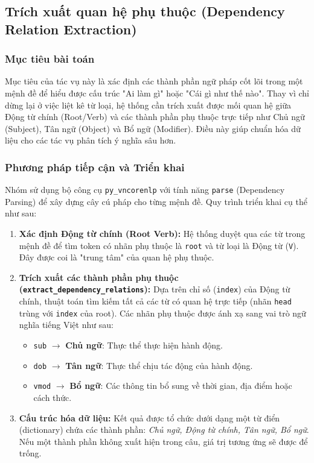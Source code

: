 \subsection{Trích xuất quan hệ phụ thuộc (Dependency Relation Extraction)}

\subsubsection{Mục tiêu bài toán}
Mục tiêu của tác vụ này là xác định các thành phần ngữ pháp cốt lõi trong một mệnh đề để hiểu được cấu trúc "Ai làm gì" hoặc "Cái gì như thế nào". Thay vì chỉ dừng lại ở việc liệt kê từ loại, hệ thống cần trích xuất được mối quan hệ giữa Động từ chính (Root/Verb) và các thành phần phụ thuộc trực tiếp như Chủ ngữ (Subject), Tân ngữ (Object) và Bổ ngữ (Modifier). Điều này giúp chuẩn hóa dữ liệu cho các tác vụ phân tích ý nghĩa sâu hơn.

\subsubsection{Phương pháp tiếp cận và Triển khai}
Nhóm sử dụng bộ công cụ \texttt{py\_vncorenlp} với tính năng \texttt{parse} (Dependency Parsing) để xây dựng cây cú pháp cho từng mệnh đề. Quy trình triển khai cụ thể như sau:

\begin{enumerate}
    \item \textbf{Xác định Động từ chính (Root Verb):} 
    Hệ thống duyệt qua các từ trong mệnh đề để tìm token có nhãn phụ thuộc là \texttt{root} và từ loại là Động từ (\texttt{V}). Đây được coi là "trung tâm" của quan hệ phụ thuộc.

    \item \textbf{Trích xuất các thành phần phụ thuộc (\texttt{extract\_dependency\_relations}):} 
    Dựa trên chỉ số (\texttt{index}) của Động từ chính, thuật toán tìm kiếm tất cả các từ có quan hệ trực tiếp (nhãn \texttt{head} trùng với \texttt{index} của root). Các nhãn phụ thuộc được ánh xạ sang vai trò ngữ nghĩa tiếng Việt như sau:
    \begin{itemize}
        \item \texttt{sub} $\rightarrow$ \textbf{Chủ ngữ}: Thực thể thực hiện hành động.
        \item \texttt{dob} $\rightarrow$ \textbf{Tân ngữ}: Thực thể chịu tác động của hành động.
        \item \texttt{vmod} $\rightarrow$ \textbf{Bổ ngữ}: Các thông tin bổ sung về thời gian, địa điểm hoặc cách thức.
    \end{itemize}

    \item \textbf{Cấu trúc hóa dữ liệu:} 
    Kết quả được tổ chức dưới dạng một từ điển (dictionary) chứa các thành phần: \textit{Chủ ngữ, Động từ chính, Tân ngữ, Bổ ngữ}. Nếu một thành phần không xuất hiện trong câu, giá trị tương ứng sẽ được để trống.
\end{enumerate}

